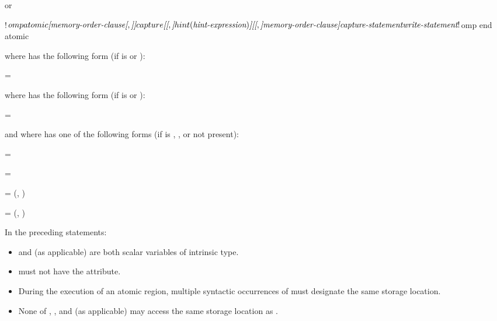 \begin{fortranspecific}
or

\begin{ompfPragma}
!$omp atomic \plc{[memory-order-clause[},\plc{]]} capture \plc{[[},\plc{]}hint(\plc{hint-expression})\plc{]}
             \plc{[[},\plc{]memory-order-clause]}
    \plc{capture-statement}
    \plc{write-statement}
!$omp end atomic
\end{ompfPragma}

where  has the following form (if 
is  or ):

\begin{indentedcodelist}
 = 
\end{indentedcodelist}

where  has the following form (if 
is  or ):

\begin{indentedcodelist}
 = 
\end{indentedcodelist}

and where  has one of the following forms (if  is ,
, or not present):

\begin{indentedcodelist}
 = 

 = 

 =  (, )

 =  (, )
\end{indentedcodelist}

In the preceding statements:

\begin{itemize}
\item {} and  (as applicable) are both scalar variables of intrinsic type.

\vspace{-2 pt} %
\item {} must not have the  attribute.

\vspace{-2 pt} %
\item During the execution of an atomic region, multiple syntactic occurrences of  must
designate the same storage location.

\vspace{-2 pt} %
\item None of , , and  (as applicable) may access the same storage location as
.


\end{itemize}
\end{fortranspecific}
